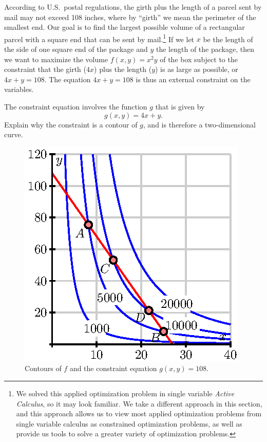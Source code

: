 \begin{pa} \label{PA:10.8}  According to U.S.~postal regulations, the girth plus the length of a parcel sent by mail may not exceed 108 inches, where by ``girth'' we mean the perimeter of the smallest end.  Our goal is to find the largest possible volume of a rectangular parcel with a square end that can be sent by mail.\footnote{We solved this applied optimization problem in single variable \emph{Active Calculus}, so it may look familiar. We take a different approach in this section, and this approach allows us to view most applied optimization problems from single variable calculus as constrained optimization problems, as well as provide us tools to solve a greater variety of optimization problems.} If we let $x$ be the length of the side of one square end of the package and $y$ the length of the package, then we want to maximize the volume $f(x,y) = x^2y$ of the box subject to the constraint that the girth ($4x$) plus the length ($y$) is as large as possible, or $4x+y = 108$.  The equation $4x + y = 108$ is thus an external constraint on the variables. 
    \ba
    \item The constraint equation involves the function $g$ that is given by
    \[g(x,y) = 4x+y.\]
    Explain why the constraint is a contour of $g$, and is therefore a two-dimensional curve.

  \begin{figure}[ht]
  \begin{center}
    \includegraphics{figures/fig_10_8_postal.eps}
  \end{center}
  \caption{Contours of $f$ and the constraint equation $g(x,y) = 108$.}
  \label{F:10.8.preview}
  \end{figure}


\end{pa}
